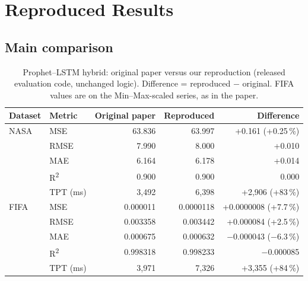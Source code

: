 \documentclass[11pt,a4paper]{article}
\newcommand{\FIFAMSE}{0.0000118}  \newcommand{\FIFAdMSE}{+0.0000008 (+7.7\,\%)}
\newcommand{\FIFARMSE}{0.003442}  \newcommand{\FIFAdRMSE}{+0.000084 (+2.5\,\%)}
\newcommand{\FIFAMAE}{0.000632}   \newcommand{\FIFAdMAE}{$-$0.000043 ($-$6.3\,\%)}
\newcommand{\FIFARsq}{0.998233}   \newcommand{\FIFAdRsq}{$-$0.000085}
\newcommand{\FIFATPT}{7{,}326}    \newcommand{\FIFAdTPT}{+3{,}355 (+84\,\%)}
\begin{document}
\section{Reproduced Results}
\subsection{Main comparison}
\begin{table}[h]\centering\small
\caption{Prophet--LSTM hybrid: original paper versus our reproduction (released evaluation code, unchanged logic). Difference = reproduced $-$ original. FIFA values are on the Min--Max-scaled series, as in the paper.}\label{tab:main}
\begin{tabular}{@{}llrrr@{}}\toprule
Dataset & Metric & Original paper & Reproduced & Difference \\\midrule
NASA & MSE  & 63.836 & 63.997 & +0.161 (+0.25\,\%)\\
     & RMSE & 7.990  & 8.000  & +0.010 \\
     & MAE  & 6.164  & 6.178  & +0.014 \\
     & R\textsuperscript{2} & 0.900 & 0.900 & 0.000 \\
     & TPT (ms) & 3{,}492 & 6{,}398 & +2{,}906 (+83\,\%) \\\midrule
FIFA & MSE  & 0.000011 & \FIFAMSE & \FIFAdMSE \\
     & RMSE & 0.003358 & \FIFARMSE & \FIFAdRMSE \\
     & MAE  & 0.000675 & \FIFAMAE & \FIFAdMAE \\
     & R\textsuperscript{2} & 0.998318 & \FIFARsq & \FIFAdRsq \\
     & TPT (ms) & 3{,}971 & \FIFATPT & \FIFAdTPT \\
\bottomrule\end{tabular}
\end{table}
\end{document}
